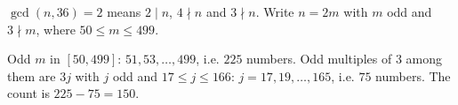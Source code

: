 $\gcd(n,36)=2$ means $2\mid n$, $4\nmid n$ and $3\nmid n$. Write $n=2m$ with $m$ odd and $3\nmid m$, where $50\le m\le499$.

Odd $m$ in $[50,499]$: $51,53,\dots,499$, i.e. $225$ numbers. Odd multiples of $3$ among them are $3j$ with $j$ odd and $17\le j\le166$: $j=17,19,\dots,165$, i.e. $75$ numbers. The count is $225-75=\boxed{150}$.
